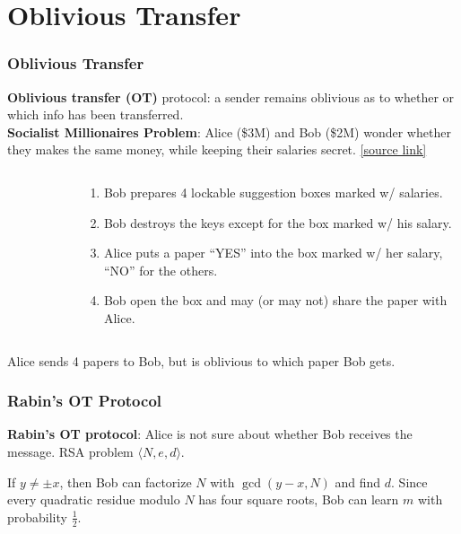 \section{Oblivious Transfer}
\begin{frame}\frametitle{Oblivious Transfer}
\textbf{Oblivious transfer (OT)} protocol: a sender remains oblivious as to whether or which info has been transferred. \\
\footnotesize \textbf{Socialist Millionaires Problem}: Alice (\$3M) and Bob (\$2M) wonder whether they makes the same money, while keeping their salaries secret. \href{http://twistedoakstudios.com/blog/Post3724_explain-it-like-im-five-the-socialist-millionaire-problem-and-secure-multi-party-computation}{\alert{[source link]}}
\begin{columns}
\begin{column}{6cm}
\begin{figure}
\begin{center}

\end{center}
\end{figure}
\end{column}
\begin{column}{6cm}
\footnotesize
\begin{enumerate}
\item Bob prepares 4 lockable suggestion boxes marked w/ salaries.
\item Bob destroys the keys except for the box marked w/ his salary.
\item Alice puts a paper ``YES'' into the box marked w/ her salary, ``NO'' for the others.
\item Bob open the box and may (or may not) share the paper with Alice.
\end{enumerate}
\end{column}
\end{columns}
\alert{Alice sends 4 papers to Bob, but is oblivious to which paper Bob gets.}
\end{frame}
\begin{frame}\frametitle{Rabin's OT Protocol}
\textbf{Rabin's OT protocol}: Alice is not sure about whether Bob receives the message. RSA problem $\langle N, e, d\rangle $.
\begin{figure}
\begin{center}

\end{center}
\end{figure}
If $y \neq \pm x$, then Bob can factorize $N$ with $\gcd(y-x,N)$ and find $d$. Since every quadratic residue modulo $N$ has four square roots, Bob can learn $m$ with probability $\frac{1}{2}$.
\end{frame}
